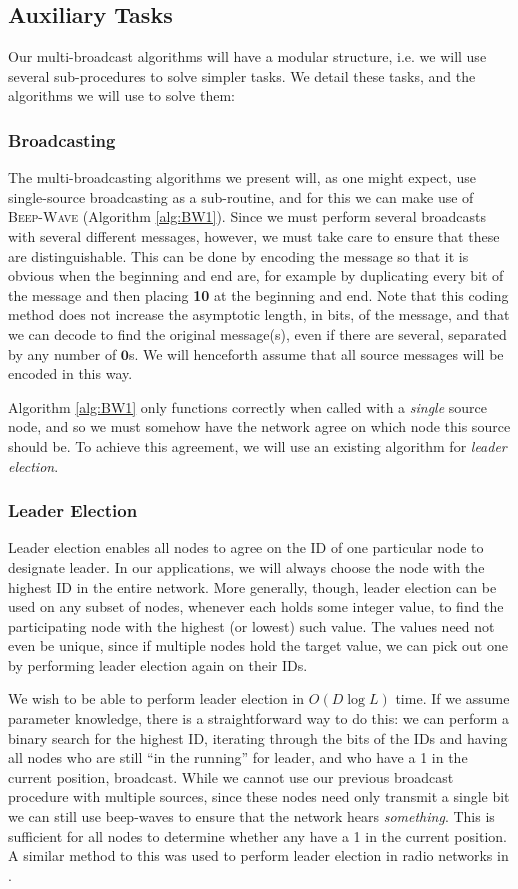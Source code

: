 \documentclass{article}
\begin{document}
\subsection{Auxiliary Tasks}
Our multi-broadcast algorithms will have a modular structure, i.e. we will use several sub-procedures to solve simpler tasks. We detail these tasks, and the algorithms we will use to solve them:

\subsubsection{Broadcasting}
The multi-broadcasting algorithms we present will, as one might expect, use single-source broadcasting as a sub-routine, and for this we can make use of \textsc{Beep-Wave} (Algorithm \ref{alg:BW1}). Since we must perform several broadcasts with several different messages, however, we must take care to ensure that these are distinguishable. This can be done by encoding the message so that it is obvious when the beginning and end are, for example by duplicating every bit of the message and then placing \textbf{10} at the beginning and end. Note that this coding method does not increase the asymptotic length, in bits, of the message, and that we can decode to find the original message(s), even if there are several, separated by any number of $\textbf{0}$s. We will henceforth assume that all source messages will be encoded in this way.

Algorithm \ref{alg:BW1} only functions correctly when called with a \emph{single} source node, and so we must somehow have the network agree on which node this source should be. To achieve this agreement, we will use an existing algorithm for \emph{leader election}.

\subsubsection{Leader Election}
Leader election enables all nodes to agree on the ID of one particular node to designate leader. In our applications, we will always choose the node with the highest ID in the entire network. More generally, though, leader election can be used on any subset of nodes, whenever each holds some integer value, to find the participating node with the highest (or lowest) such value. The values need not even be unique, since if multiple nodes hold the target value, we can pick out one by performing leader election again on their IDs. 

We wish to be able to perform leader election in $O(D\log L)$ time. If we assume parameter knowledge, there is a straightforward way to do this: we can perform a binary search for the highest ID, iterating through the bits of the IDs and having all nodes who are still ``in the running'' for leader, and who have a 1 in the current position, broadcast. While we cannot use our previous broadcast procedure with multiple sources, since these nodes need only transmit a single bit we can still use beep-waves to ensure that the network hears \emph{something}. This is sufficient for all nodes to determine whether any have a 1 in the current position. A similar method to this was used to perform leader election in radio networks in \cite{-CGR00}.
\end{document}
